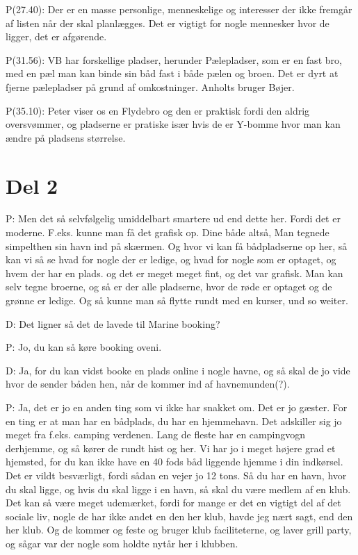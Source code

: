 \documentclass{article}
\begin{document}
P(27.40): Der er en masse personlige, menneskelige og interesser der ikke fremgår af listen når der skal planlægges. Det er vigtigt for nogle mennesker hvor de ligger, det er afgørende.

P(31.56): VB har forskellige pladser, herunder Pælepladser, som er en fast bro, med en pæl man kan binde sin båd fast i både pælen og broen. Det er dyrt at fjerne pælepladser på grund af omkostninger. Anholts bruger Bøjer.

P(35.10): Peter viser os en Flydebro og den er praktisk fordi den aldrig oversvømmer, og pladserne er pratiske især hvis de er Y-bomme hvor man kan ændre på pladsens størrelse.

\section{Del 2}

P: Men det så selvfølgelig umiddelbart smartere ud end dette her. Fordi det er moderne. F.eks. kunne man få det grafisk op. Dine både altså, Man tegnede simpelthen sin havn ind på skærmen. Og hvor vi kan få bådpladserne op her, så kan vi så se hvad for nogle der er ledige, og hvad for nogle som er optaget, og hvem der har en plads. og det er meget meget fint, og det var grafisk. Man kan selv tegne broerne, og så er der alle pladserne, hvor de røde er optaget og de grønne er ledige. Og så kunne man så flytte rundt med en kurser, und so weiter.

D: Det ligner så det de lavede til Marine booking?

P: Jo, du kan så køre booking oveni.

D: Ja, for du kan vidst booke en plads online i nogle havne, og så skal de jo vide hvor de sender båden hen, når de kommer ind af havnemunden(?).

P: Ja, det er jo en anden ting som vi ikke har snakket om. Det er jo gæster. For en ting er at man har en bådplads, du har en hjemmehavn. Det adskiller sig jo meget fra f.eks. camping verdenen. Lang de fleste har en campingvogn derhjemme, og så kører de rundt hist og her. Vi har jo i meget højere grad et hjemsted, for du kan ikke have en 40 fods båd liggende hjemme i din indkørsel. Det er vildt besværligt, fordi sådan en vejer jo 12 tons. Så du har en havn, hvor du skal ligge, og hvis du skal ligge i en havn, så skal du være medlem af en klub. Det kan så være meget udemærket, fordi for mange er det en vigtigt del af det sociale liv, nogle de har ikke andet en den her klub, havde jeg nært sagt, end den her klub. Og de kommer og feste og bruger klub faciliteterne, og laver grill party, og sågar var der nogle som holdte nytår her i klubben.
\end{document}
